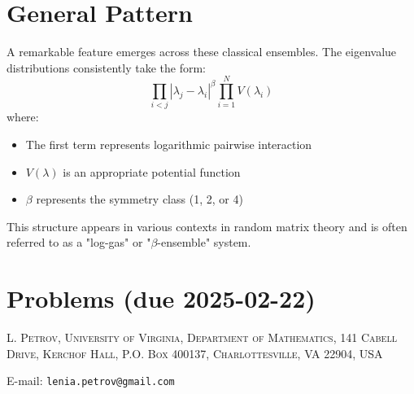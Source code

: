 \documentclass[letterpaper,11pt,oneside,reqno]{article}
\numberwithin{equation}{section}
\theoremstyle{definition}
\begin{document}
\section{General Pattern}

A remarkable feature emerges across these classical ensembles. The eigenvalue distributions consistently take the form:
\[ \prod_{i<j} |\lambda_j-\lambda_i|^\beta \prod_{i=1}^N V(\lambda_i) \]
where:
\begin{itemize}
\item The first term represents logarithmic pairwise interaction
\item $V(\lambda)$ is an appropriate potential function
\item $\beta$ represents the symmetry class (1, 2, or 4)
\end{itemize}

This structure appears in various contexts in random matrix theory and is often referred to as a "log-gas" or "$\beta$-ensemble" system.














\appendix
\setcounter{section}{2}

\section{Problems (due 2025-02-22)}
















\medskip

\textsc{L. Petrov, University of Virginia, Department of Mathematics, 141 Cabell Drive, Kerchof Hall, P.O. Box 400137, Charlottesville, VA 22904, USA}

E-mail: \texttt{lenia.petrov@gmail.com}
\end{document}
